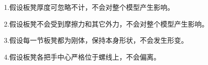 \documentclass[../main.tex]{subfiles}
\begin{document}
 \par 1.假设板凳厚度可忽略不计，不会对整个模型产生影响。
\par 2.假设板凳不会受到摩擦力和其它外力，不会对整个模型产生影响。
\par3.假设每一节板凳都为刚体，保持本身形状，不会发生形变。
\par4.假设板凳各把手中心严格位于螺线上，不会偏离。 
\end{document}
